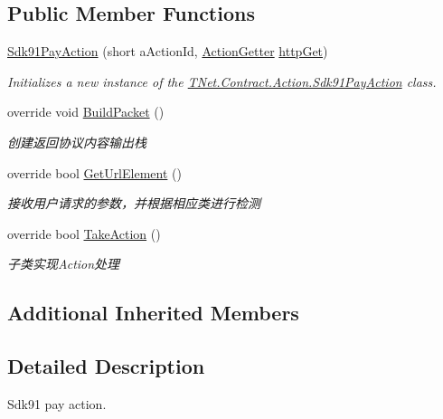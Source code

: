 \subsection*{Public Member Functions}
\begin{DoxyCompactItemize}
\item 
\mbox{\hyperlink{class_t_net_1_1_contract_1_1_action_1_1_sdk91_pay_action_a111b2d052478a702b1a64b1906183a48}{Sdk91\+Pay\+Action}} (short a\+Action\+Id, \mbox{\hyperlink{class_t_net_1_1_service_1_1_action_getter}{Action\+Getter}} \mbox{\hyperlink{class_t_net_1_1_service_1_1_base_struct_a04c1171f14d9ee44612f9966a8d61d30}{http\+Get}})
\begin{DoxyCompactList}\small\item\em Initializes a new instance of the \mbox{\hyperlink{class_t_net_1_1_contract_1_1_action_1_1_sdk91_pay_action}{T\+Net.\+Contract.\+Action.\+Sdk91\+Pay\+Action}} class. \end{DoxyCompactList}\item 
override void \mbox{\hyperlink{class_t_net_1_1_contract_1_1_action_1_1_sdk91_pay_action_a37f97a0cae08625043cac4f804e1c368}{Build\+Packet}} ()
\begin{DoxyCompactList}\small\item\em 创建返回协议内容输出栈 \end{DoxyCompactList}\item 
override bool \mbox{\hyperlink{class_t_net_1_1_contract_1_1_action_1_1_sdk91_pay_action_a9b4fe6d3246d487a71ec194e120dfc2c}{Get\+Url\+Element}} ()
\begin{DoxyCompactList}\small\item\em 接收用户请求的参数，并根据相应类进行检测 \end{DoxyCompactList}\item 
override bool \mbox{\hyperlink{class_t_net_1_1_contract_1_1_action_1_1_sdk91_pay_action_a430e62dca404f98f769d4eef297c19e8}{Take\+Action}} ()
\begin{DoxyCompactList}\small\item\em 子类实现\+Action处理 \end{DoxyCompactList}\end{DoxyCompactItemize}
\subsection*{Additional Inherited Members}


\subsection{Detailed Description}
Sdk91 pay action. 



